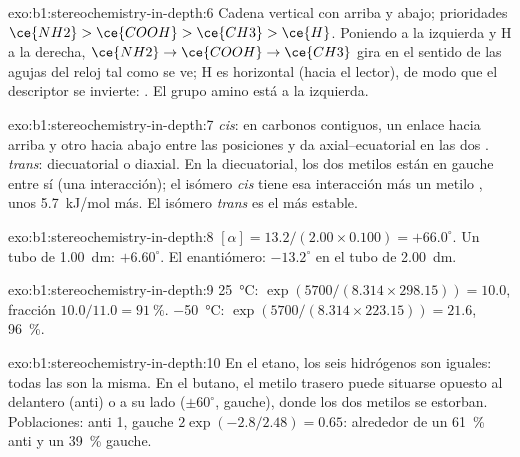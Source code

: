 \begin{solution}{exo:b1:stereochemistry-in-depth:6}
Cadena vertical con  arriba y  abajo; prioridades
$\ce{NH2} > \ce{COOH} > \ce{CH3} > \ce{H}$. Poniendo  a la
izquierda y H a la derecha, $\ce{NH2} \to \ce{COOH} \to \ce{CH3}$ gira en
el sentido de las agujas del reloj tal como se ve; H es horizontal (hacia
el lector), de modo que el descriptor se invierte: . El grupo
amino está a la izquierda.
\end{solution}

\begin{solution}{exo:b1:stereochemistry-in-depth:7}
\textit{cis}: en carbonos contiguos, un enlace hacia arriba y otro hacia
abajo entre las posiciones  y  da axial--ecuatorial en
las dos . \textit{trans}: diecuatorial o diaxial. En la 
diecuatorial, los dos metilos están en gauche entre sí (una interacción);
el isómero \textit{cis} tiene esa interacción más un metilo , unos
\qty{5.7}{kJ/mol} más. El isómero \textit{trans} es el más estable.
\end{solution}

\begin{solution}{exo:b1:stereochemistry-in-depth:8}
$[\alpha] = 13.2/(2.00 \times 0.100) = +66.0^\circ$. Un tubo de
\qty{1.00}{dm}: $+6.60^\circ$. El enantiómero: $-13.2^\circ$ en el tubo de
\qty{2.00}{dm}.
\end{solution}

\begin{solution}{exo:b1:stereochemistry-in-depth:9}
\qty{25}{\celsius}: $\exp(5700/(8.314 \times 298.15)) = 10.0$, fracción
$10.0/11.0 = \qty{91}{\percent}$. \qty{-50}{\celsius}: $\exp(5700/(8.314
\times 223.15)) = 21.6$, \qty{96}{\percent}.
\end{solution}

\begin{solution}{exo:b1:stereochemistry-in-depth:10}
En el etano, los seis hidrógenos son iguales: todas las  son la misma. En el butano, el metilo trasero puede situarse
opuesto al delantero (anti) o a su lado ($\pm 60^\circ$, gauche), donde
los dos metilos se estorban. Poblaciones: anti 1, gauche
$2\exp(-2.8/2.48) = 0.65$: alrededor de un \qty{61}{\percent} anti y un
\qty{39}{\percent} gauche.
\end{solution}

